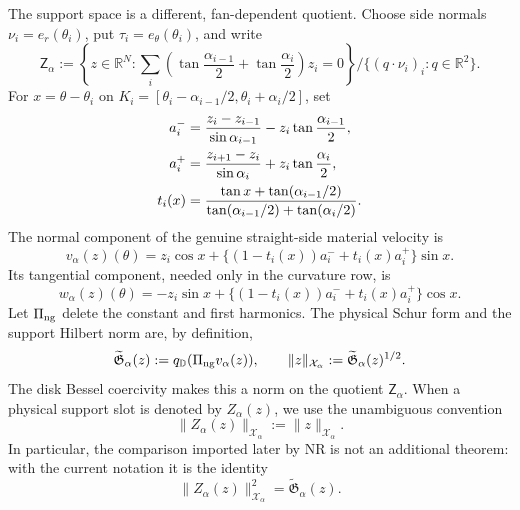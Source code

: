 \documentclass[11pt]{amsart}
\numberwithin{equation}{section}
\theoremstyle{definition}
\theoremstyle{remark}
\newcommand{\PiNG}{\Pi_{\rm ng}}
\newcommand{\Gtilde}{\widetilde{\mathfrak G}}
\newcommand{\qD}{q_{\mathbb D}}
\newcommand{\X}{\mathcal X}
\begin{document}
The support space is a different, fan-dependent quotient.  Choose side
normals $\nu_i=e_r(\theta_i)$, put $\tau_i=e_\theta(\theta_i)$, and write
\begin{equation}\label{CT:eq:support-area-row}
 \mathsf Z_\alpha
 :=\left\{z\in\mathbb R^N:
 \sum_i\left(\tan\frac{\alpha_{i-1}}2+
              \tan\frac{\alpha_i}2\right)z_i=0\right\}
 \big/\{(q\cdot\nu_i)_i:q\in\mathbb R^2\}.
\end{equation}
For $x=\theta-\theta_i$ on
$K_i=[\theta_i-\alpha_{i-1}/2,\theta_i+\alpha_i/2]$, set
\begin{align}
 a_i^-&=\frac{z_i-z_{i-1}}{\sin\alpha_{i-1}}
          -z_i\tan\frac{\alpha_{i-1}}2,\notag\\
 a_i^+&=\frac{z_{i+1}-z_i}{\sin\alpha_i}
          +z_i\tan\frac{\alpha_i}2,\label{CT:eq:support-endpoint-jets}\\
 t_i(x)&=\frac{\tan x+\tan(\alpha_{i-1}/2)}
 {\tan(\alpha_{i-1}/2)+\tan(\alpha_i/2)}.\notag
\end{align}
The normal component of the genuine straight-side material velocity is
\begin{equation}\label{CT:eq:physical-normal-trace}
 v_\alpha(z)(\theta)
 =z_i\cos x+\bigl\{(1-t_i(x))a_i^-+t_i(x)a_i^+\bigr\}\sin x.
\end{equation}
Its tangential component, needed only in the curvature row, is
\begin{equation}\label{CT:eq:physical-tangential-trace}
 w_\alpha(z)(\theta)
 =-z_i\sin x+\bigl\{(1-t_i(x))a_i^-+t_i(x)a_i^+\bigr\}\cos x.
\end{equation}
Let $\PiNG$ delete the constant and first harmonics.  The physical Schur
form and the support Hilbert norm are, by definition,
\begin{equation}\label{CT:eq:Xalpha-definition}
 \Gtilde_\alpha(z)
 :=\qD(\PiNG v_\alpha(z)),
 \qquad
 \|z\|_{\X_\alpha}:=\Gtilde_\alpha(z)^{1/2}.
\end{equation}
The disk Bessel coercivity makes this a norm on the quotient
$\mathsf Z_\alpha$.  When a physical support slot is denoted by
$Z_\alpha(z)$, we use the unambiguous convention
\begin{equation}\label{CT:eq:support-X-convention}
 \|Z_\alpha(z)\|_{\X_\alpha}:=\|z\|_{\X_\alpha}.
\end{equation}
In particular, the comparison imported later by NR is not an additional
theorem: with the current notation it is the identity
\begin{equation}\label{CT:eq:exact-norm-interface}
 \boxed{\|Z_\alpha(z)\|_{\X_\alpha}^2
        =\Gtilde_\alpha(z).}
\end{equation}
\end{document}
